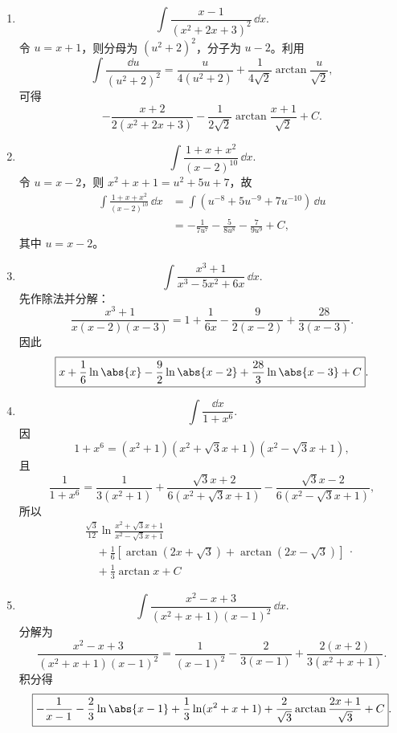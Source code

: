 \begin{enumerate}
\begin{enumerate}[label=(\arabic*)]
    \item
    \[
      \int\frac{x-1}{(x^2+2x+3)^2}\,\dd x.
    \]
    令 $u=x+1$，则分母为 $(u^2+2)^2$，分子为 $u-2$。利用
    \[
      \int\frac{\dd u}{(u^2+2)^2}
      =\frac{u}{4(u^2+2)}+\frac1{4\sqrt2}\arctan\frac{u}{\sqrt2},
    \]
    可得
    \[
      \boxed{-\frac{x+2}{2(x^2+2x+3)}
      -\frac1{2\sqrt2}\arctan\frac{x+1}{\sqrt2}+C}.
    \]

    \item
    \[
      \int\frac{1+x+x^2}{(x-2)^{10}}\,\dd x.
    \]
    令 $u=x-2$，则 $x^2+x+1=u^2+5u+7$，故
    \begin{align*}
      \int\frac{1+x+x^2}{(x-2)^{10}}\,\dd x
      &=\int(u^{-8}+5u^{-9}+7u^{-10})\,\dd u\\
      &=\boxed{-\frac1{7u^7}-\frac5{8u^8}-\frac7{9u^9}+C},
    \end{align*}
    其中 $u=x-2$。

    \item
    \[
      \int\frac{x^3+1}{x^3-5x^2+6x}\,\dd x.
    \]
    先作除法并分解：
    \[
      \frac{x^3+1}{x(x-2)(x-3)}
      =1+\frac1{6x}-\frac9{2(x-2)}+\frac{28}{3(x-3)}.
    \]
    因此
    \[
      \boxed{x+\frac16\ln\abs{x}
      -\frac92\ln\abs{x-2}
      +\frac{28}{3}\ln\abs{x-3}+C}.
    \]

    \item
    \[
      \int\frac{\dd x}{1+x^6}.
    \]
    因
    \[
      1+x^6=(x^2+1)(x^2+\sqrt3x+1)(x^2-\sqrt3x+1),
    \]
    且
    \[
      \frac1{1+x^6}
      =\frac1{3(x^2+1)}
       +\frac{\sqrt3x+2}{6(x^2+\sqrt3x+1)}
       -\frac{\sqrt3x-2}{6(x^2-\sqrt3x+1)},
    \]
    所以
    \[
      \boxed{\begin{aligned}
      &\frac{\sqrt3}{12}\ln\frac{x^2+\sqrt3x+1}{x^2-\sqrt3x+1}\\
      &\quad+\frac16\left[
        \arctan(2x+\sqrt3)+\arctan(2x-\sqrt3)
      \right]\\
      &\quad+\frac13\arctan x+C
      \end{aligned}}.
    \]

    \item
    \[
      \int\frac{x^2-x+3}{(x^2+x+1)(x-1)^2}\,\dd x.
    \]
    分解为
    \[
      \frac{x^2-x+3}{(x^2+x+1)(x-1)^2}
      =\frac1{(x-1)^2}-\frac2{3(x-1)}
       +\frac{2(x+2)}{3(x^2+x+1)}.
    \]
    积分得
    \[
      \boxed{-\frac1{x-1}-\frac23\ln\abs{x-1}
      +\frac13\ln(x^2+x+1)
      +\frac2{\sqrt3}\arctan\frac{2x+1}{\sqrt3}+C}.
    \]
  \end{enumerate}


\end{enumerate}
